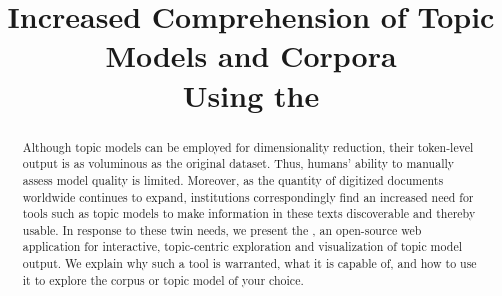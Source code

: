 \documentclass[11pt]{article}
\title{Increased Comprehension of Topic Models and Corpora\\ Using the \tool}
\begin{document}
\maketitle

\begin{abstract}
Although topic models can be employed for dimensionality reduction, their
token-level output is as voluminous as the original dataset. Thus, humans'
ability to manually assess model quality is limited. Moreover, as the quantity of
digitized documents worldwide continues to expand, institutions correspondingly
find an increased need for tools such as topic models to make information in
these texts discoverable and thereby usable. In response to these twin needs, we
present the \tool, an open-source web application for interactive, topic-centric
exploration and visualization of topic model output. We explain why such a tool
is warranted, what it is capable of, and how to use it to explore the corpus or
topic model of your choice.%
\end{abstract}
\end{document}
